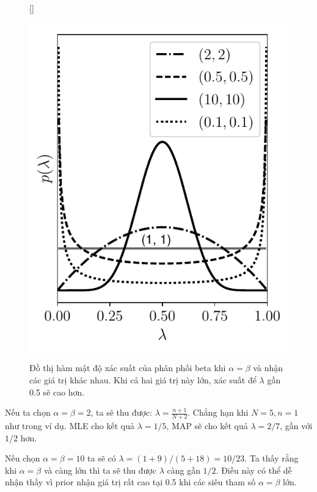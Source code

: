 \begin{figure}[t]
[\FBwidth]
{\caption{ Đồ thị hàm mật độ xác suất của phân phối beta khi $\alpha =
\beta$ và nhận các giá trị khác nhau. Khi cả hai giá trị này lớn, xác suất
để $\lambda$ gần 0.5 sẽ cao hơn. }
\label{fig:31_1}}
{ %
\includegraphics[width=.45\textwidth]{Chapters/02_LinearAlgebra/30_prob/python/beta1.pdf}
}
\end{figure}





Nếu ta chọn $\alpha = \beta = 2$, ta sẽ thu được:
\begin{math} \displaystyle
\lambda= \frac{n + 1}{N + 2}
\end{math}.
Chẳng hạn khi $N = 5, n = 1$ như trong ví dụ. MLE cho kết quả $\lambda = 1/5$,
MAP sẽ cho kết quả $\lambda = 2/7$, gần với $1/2$ hơn.

Nếu chọn $\alpha = \beta = 10$ ta sẽ có $\lambda = (1 + 9)/(5 + 18) = 10/23$. Ta
thấy rằng khi $\alpha = \beta$ và càng lớn thì ta sẽ thu được $\lambda$ càng gần
$1/2$. Điều này có thể dễ nhận thấy vì prior nhận giá trị rất cao tại 0.5 khi
các siêu tham số $\alpha = \beta$ lớn.


